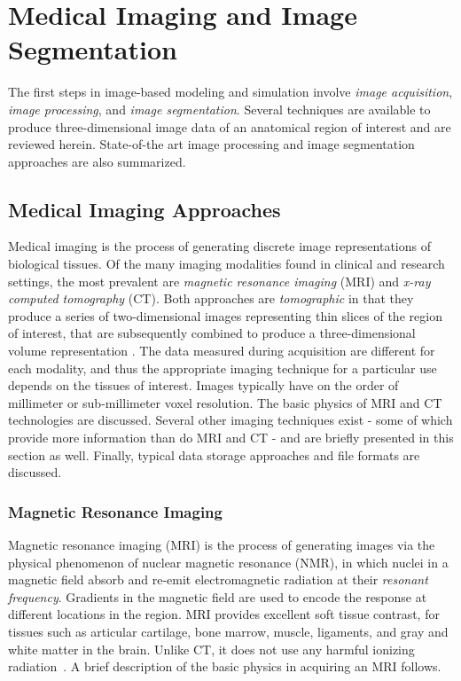 \chapter{Medical Imaging and Image Segmentation}
%

The first steps in image-based modeling and simulation involve \textit{image acquisition}, \textit{image processing}, and \textit{image segmentation}. Several techniques are available to produce three-dimensional image data of an anatomical region of interest and are reviewed herein. State-of-the art image processing and image segmentation approaches are also summarized.

\section{Medical Imaging Approaches}
\label{Medical Imaging Approaches}

Medical imaging is the process of generating discrete image representations of biological tissues. Of the many imaging modalities found in clinical and research settings, the most prevalent are \textit{magnetic resonance imaging} (MRI) and \textit{x-ray computed tomography} (CT). Both approaches are \textit{tomographic} in that they produce a series of two-dimensional images representing thin slices of the region of interest, that are subsequently combined to produce a three-dimensional volume representation \cite{larobina_murino_2014}. The data measured during acquisition are different for each modality, and thus the appropriate imaging technique for a particular use depends on the tissues of interest. Images typically have on the order of millimeter or sub-millimeter voxel resolution. The basic physics of MRI and CT technologies are discussed. Several other imaging techniques exist - some of which provide more information than do MRI and CT - and are briefly presented in this section as well. Finally, typical data storage approaches and file formats are discussed.

\subsection{Magnetic Resonance Imaging}
\label{Magnetic Resonance Imaging}

Magnetic resonance imaging (MRI) is the process of generating images via the physical phenomenon of nuclear magnetic resonance (NMR), in which nuclei in a magnetic field absorb and re-emit electromagnetic radiation at their \textit{resonant frequency}. Gradients in the magnetic field are used to encode the response at different locations in the region. MRI provides excellent soft tissue contrast, for tissues such as articular cartilage, bone marrow, muscle, ligaments, and gray and white matter in the brain. Unlike CT, it does not use any harmful ionizing radiation~\cite{waldman_campbell}. A brief description of the basic physics in acquiring an MRI follows.

